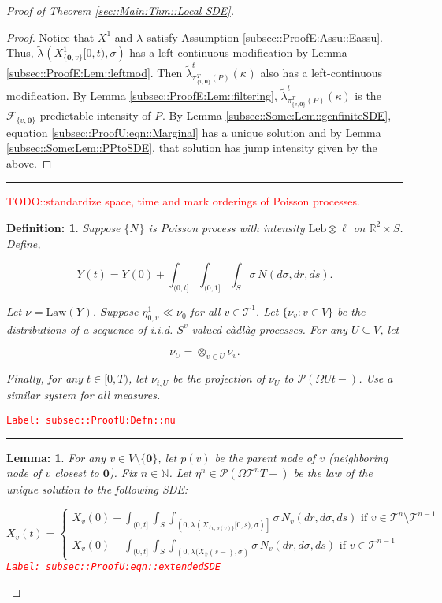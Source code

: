 \documentclass[12pt]{article}
\newcommand{\mb}{\mathbb}
\newcommand{\mc}{\mathcal}
\newcommand{\ov}{\overline}
\newcommand{\te}{\text}
\newcommand{\tr}{\textcolor{red}}
\newcommand{\labe}[1]{\tr{\texttt{Label: #1}}}
\newcommand{\lin}{\rule{\linewidth}{0.4 pt}}
\newcommand{\pmsr}{\mc{P}}							%
\renewcommand{\root}{\mathbf{0}}				%
\renewcommand{\v}{v}							%
\renewcommand{\U}{U}							%
\renewcommand{\S}{S}							%
\newcommand{\s}{\sigma}							%
\newcommand{\T}{T}								%
\renewcommand{\t}{t}							%
\newcommand{\cl}{\ov}							%
\newcommand{\poiss}[1]{N_{#1}}						%
\newcommand{\law}{\te{Law}}							%
\newcommand{\leb}{\te{Leb}}							%
\newcommand{\pup}[1]{^{#1}}							%
\newcommand{\tree}{\mc{T}}							%
\newcommand{\V}{V}									%
\renewcommand{\tt}{s}								%
\renewcommand{\r}{r}								%
\newcommand{\numb}{n}								%
\newcommand{\piV}[2]{\pi_{#1}^{#2}}					%
\newcommand{\rxvt}[2]{X_{#1}{(#2)}}					%
\newcommand{\rxvtt}[2]{Y_{#1}{(#2)}}				%
\newcommand{\rxvts}[2]{X_{#1}{#2}}					%
\newcommand{\rxvtsn}[3]{X_{#1}^{#3}{#2}}			%
\newcommand{\rxvtts}[2]{Y_{#1}{#2}}					%
\newcommand{\rp}[1]{P^{#1}}							%
\newcommand{\mm}[3]{\nu_{#2#1}^{#3}}						%
\newcommand{\mmm}[3]{\eta_{#2#1}^{#3}}						%
\newcommand{\rate}[1]{\lambda_{#1}}					%
\newcommand{\crate}[2]{\alt{\lambda}_{#1}^{#2}}		%
\newcommand{\F}[2]{\mc{F}_{#1}^{#2}}				%
\newcommand{\Sm}{\ell}								%
\newcommand{\alt}{\widetilde}						%
\renewcommand{\mark}[1]{\kappa^{#1}}				%
\newcommand{\p}[1]{p(#1)}						%
\newtheorem{lem}[thms]{Lemma: }
\newtheorem{defn}[thms]{Definition: }
\begin{document}
\begin{proof}[Proof of Theorem \ref{sec::Main:Thm::Local SDE}]
\begin{proof}
Notice that \(\rxvtsn{}{}{1}\) and \(\rate{}\) satisfy Assumption \ref{subsec::ProofE:Assu::Eassu}. Thus, \(\crate{}{}(\rxvtsn{\{\root,\v\}}{[0,\t)}{1},\s)\) has a left-continuous modification by Lemma \ref{subsec::ProofE:Lem::leftmod}. Then \(\crate{\piV{\{\v,\root\}}{\T}(\rp{})}{\t}(\mark{})\) also has a left-continuous modification. By Lemma \ref{subsec::ProofE:Lem::filtering}, \(\crate{\piV{\{\v,\root\}}{\T}(\rp{})}{\t}(\kappa)\) is the \(\F{\{\v,\root\}}{}\)-predictable intensity of \(\rp{}\). By Lemma \ref{subsec::Some:Lem::genfiniteSDE}, equation \eqref{subsec::ProofU:eqn::Marginal} has a unique solution and by Lemma \ref{subsec::Some:Lem::PPtoSDE}, that solution has jump intensity given by the above.

\end{proof}

\lin

\tr{TODO::standardize space, time and mark orderings of Poisson processes.}

\begin{defn}
Suppose \(\{\poiss{}\}\) is Poisson process with intensity \(\leb\otimes \Sm\) on \(\mb{R}^2\times \S\). Define,

\[\rxvtt{}{\t} = \rxvtt{}{0} + \int_{(0,\t]}\int_{(0,1]}\int_\S\s\,\poiss{}(d\s,d\r,d\tt).\]

Let \(\mm{}{}{} = \law(\rxvtts{}{})\). Suppose \(\mmm{\v}{0,}{1}\ll\mm{}{0}{}\) for all \(\v\in\tree\pup{1}\). Let \(\{\mm{\v}{}{}:\v\in\V\}\) be the distributions of a sequence of i.i.d. \(\S^{\v}\)-valued c\`adl\`ag processes. For any \(\U\subseteq \V\), let 

\[\mm{\U}{}{} = \otimes_{\v\in\U} \mm{\v}{}{}.\]

Finally, for any \(\t\in [0,\T)\), let \(\mm{\U}{\t,}{}\) be the projection of \(\mm{\U}{}{}\) to \(\pmsr(\Omega{\U}{\t-})\). Use a similar system for all measures.
\label{subsec::ProofU:Defn::nu}
\end{defn}
\labe{subsec::ProofU:Defn::nu}

\lin

\begin{lem}
For any \(\v \in \V\setminus\{\root\}\), let \(\p{\v}\) be the parent node of \(\v\) (neighboring node of \(\v\) closest to \(\root\)). Fix \(\numb \in \mb{N}\). Let \(\mmm{}{}{\numb} \in \pmsr\left(\Omega{\tree\pup{\numb}}{\T-}\right)\) be the law of the unique solution to the following SDE:

\begin{equation}
\rxvt{\v}{\t} = \begin{cases}
\rxvt{\v}{0} + \int_{(0,\t]}\int_\S\int_{\left(0,\crate{}{}(\rxvts{\{\v,\p{\v}\}}{[0,\tt)},\s)\right]}\s\,\poiss{\v}(d\r,d\s,d\tt)\te{ if } \v \in \tree\pup{\numb}\setminus \tree\pup{\numb-1}\\
\rxvt{\v}{0} + \int_{(0,\t]}\int_\S\int_{\left(0,\rate{}(\rxvt{\cl{\v}}{\tt-},\s\right)}\s\,\poiss{\v}(d\r,d\s,d\tt)\te{ if } \v \in \tree\pup{\numb-1}
\end{cases}
\label{subsec::ProofU:eqn::extendedSDE}
\end{equation}
\labe{subsec::ProofU:eqn::extendedSDE}


\end{lem}
\end{proof}
\end{document}
